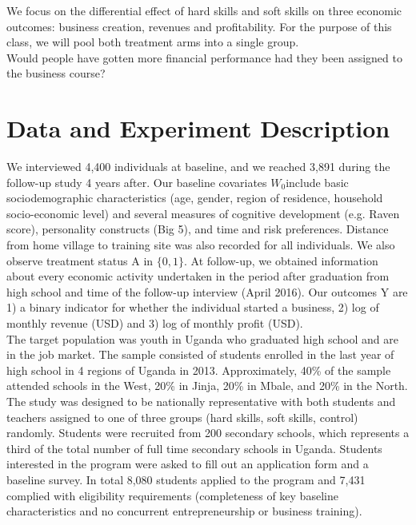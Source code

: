We focus on the differential effect of hard skills and soft skills on three economic outcomes: business creation, revenues and profitability. For the purpose of this class, we will pool both treatment arms into a single group.\\

Would people have gotten more financial performance had they been assigned to the business course?\\


\section{Data and Experiment Description}
\label{cha:data-exper-descr}

We interviewed 4,400 individuals at baseline, and we reached 3,891 during the follow-up study 4 years after. Our baseline covariates $W_0$include basic sociodemographic characteristics (age, gender, region of residence, household socio-economic level) and several measures of cognitive development (e.g. Raven score), personality constructs (Big 5), and time and risk preferences. Distance from home village to training site was also recorded for all individuals. We also observe treatment status A in $\{0,1\}$. At follow-up, we obtained information about every economic activity undertaken in the period after graduation from high school and time of the follow-up interview (April 2016). Our outcomes Y are 1) a binary indicator for whether the individual started a business, 2) log of monthly revenue (USD) and 3) log of monthly profit (USD).\\

The target population was youth in Uganda who graduated high school and are in the job market. The sample consisted of students enrolled in the last year of high school in 4 regions of Uganda in 2013. Approximately, 40\% of the sample attended schools in the West, 20\% in Jinja, 20\% in Mbale, and 20\% in the North. The study was designed to be nationally representative with both students and teachers assigned to one of three groups (hard skills, soft skills, control) randomly. Students were recruited from 200 secondary schools, which represents a third of the total number of full time secondary schools in Uganda. Students interested in the program were asked to fill out an application form and a baseline survey. In total 8,080 students applied to the program and 7,431 complied with eligibility requirements (completeness of key baseline characteristics and no concurrent entrepreneurship or business training). \\

